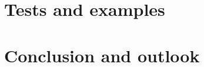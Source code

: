 \documentclass[preprint,12pt]{elsarticle}
\begin{document}
\section{Tests and examples}\label{Cases}

\section{Conclusion and outlook}\label{conclusion}






\nocite{*}








\end{document}
